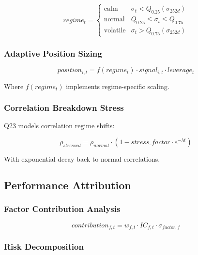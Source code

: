 \documentclass[11pt,letterpaper]{book}
\begin{document}
\begin{equation}
regime_t = \begin{cases}
    \text{calm} & \sigma_t < Q_{0.25}(\sigma_{252d}) \\
    \text{normal} & Q_{0.25} \leq \sigma_t \leq Q_{0.75} \\
    \text{volatile} & \sigma_t > Q_{0.75}(\sigma_{252d})
\end{cases}
\end{equation}

\subsubsection{Adaptive Position Sizing}

\begin{equation}
position_{i,t} = f(regime_t) \cdot signal_{i,t} \cdot leverage_t
\end{equation}

Where $f(regime_t)$ implements regime-specific scaling.

\subsubsection{Correlation Breakdown Stress}

Q23 models correlation regime shifts:

\begin{equation}
\rho_{stressed} = \rho_{normal} \cdot (1 - stress\_factor \cdot e^{-\lambda t})
\end{equation}

With exponential decay back to normal correlations.

\subsection{Performance Attribution}

\subsubsection{Factor Contribution Analysis}

\begin{equation}
contribution_{f,t} = w_{f,t} \cdot IC_{f,t} \cdot \sigma_{factor,f}
\end{equation}

\subsubsection{Risk Decomposition}
\end{document}
